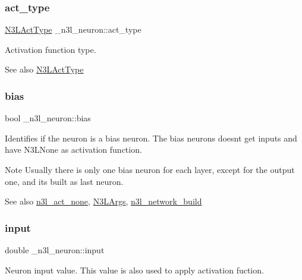 \subsubsection{\texorpdfstring{act\+\_\+type}{act\_type}}
{\footnotesize\ttfamily \hyperlink{n3__header_8h_a3118e8995213ca26bd388c3d94cd8056}{N3\+L\+Act\+Type} \+\_\+n3l\+\_\+neuron\+::act\+\_\+type}

Activation function type. \begin{DoxySeeAlso}{See also}
\hyperlink{n3__header_8h_a3118e8995213ca26bd388c3d94cd8056}{N3\+L\+Act\+Type} 
\end{DoxySeeAlso}
\mbox{\label{struct__n3l__neuron_a0f3291ff81ab13111e538622ab662069}} 
\subsubsection{\texorpdfstring{bias}{bias}}
{\footnotesize\ttfamily bool \+\_\+n3l\+\_\+neuron\+::bias}

Identifies if the neuron is a bias neuron. The bias neurons doesn\textquotesingle{}t get inputs and have N3\+L\+None as activation function. \begin{DoxyNote}{Note}
Usually there is only one bias neuron for each layer, except for the output one, and it\textquotesingle{}s built as last neuron.
\end{DoxyNote}
\begin{DoxySeeAlso}{See also}
\hyperlink{n3__act_8c_a8dc073371b15e2574897762b54f9326c}{n3l\+\_\+act\+\_\+none}, \hyperlink{structN3LArgs}{N3\+L\+Args}, \hyperlink{n3__network_8c_a5f87e1efebd658dd55d7d2ca1768bdba}{n3l\+\_\+network\+\_\+build} 
\end{DoxySeeAlso}
\mbox{\label{struct__n3l__neuron_ac896f5f8bd82c056cc61872120391048}} 
\subsubsection{\texorpdfstring{input}{input}}
{\footnotesize\ttfamily double \+\_\+n3l\+\_\+neuron\+::input}

Neuron input value. This value is also used to apply activation fuction.

